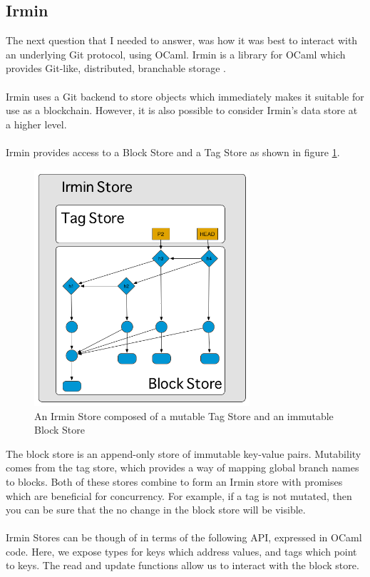 \documentclass[12pt,a4paper,twoside,openright]{report}
\begin{document}
	\subsection*{Irmin}
		The next question that I needed to answer, was how it was best to interact with an underlying Git protocol, using OCaml. Irmin is a library for OCaml which provides Git-like, distributed, branchable storage \cite{Irmin}.\\
		\\
		Irmin uses a Git backend to store objects which immediately makes it suitable for use as a blockchain. However, it is also possible to consider Irmin's data store at a higher level. \\
		\\
		Irmin provides access to a Block Store and a Tag Store as shown in figure \ref{fig:IrminBlockStore}.
		\begin{figure}
			\begin{center}
			\includegraphics[width=8cm]{figs/irmin-stores.png}
			\caption{An Irmin Store composed of a mutable Tag Store and an immutable Block Store}
			\label{fig:IrminBlockStore}
			\end{center}
		\end{figure}
		The block store is an append-only store of immutable key-value pairs. Mutability comes from the tag store, which provides a way of mapping global branch names to blocks. Both of these stores combine to form an Irmin store with  promises which are beneficial for concurrency. For example, if a tag is not mutated, then you can be sure that the no change in the block store will be visible.\\
		\\
		Irmin Stores can be though of in terms of the following API, expressed in OCaml code. Here, we expose types for keys which address values, and tags which point to keys. The read and update functions allow us to interact with the block store. \\
\end{document}
